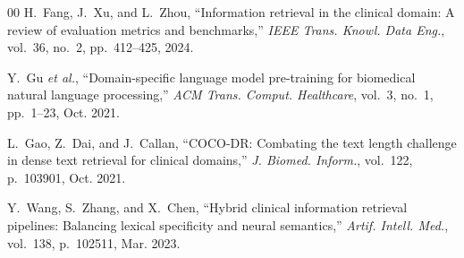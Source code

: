 \documentclass[conference]{IEEEtran}
\begin{document}
\begin{thebibliography}{00}
H.~Fang, J.~Xu, and L.~Zhou, ``Information retrieval in the clinical domain: A review of evaluation metrics and benchmarks,'' \textit{IEEE Trans. Knowl. Data Eng.}, vol.~36, no.~2, pp.~412--425, 2024.

Y.~Gu \textit{et al.}, ``Domain-specific language model pre-training for biomedical natural language processing,'' \textit{ACM Trans. Comput. Healthcare}, vol.~3, no.~1, pp.~1--23, Oct. 2021.

L.~Gao, Z.~Dai, and J.~Callan, ``COCO-DR: Combating the text length challenge in dense text retrieval for clinical domains,'' \textit{J. Biomed. Inform.}, vol.~122, p.~103901, Oct. 2021.

Y.~Wang, S.~Zhang, and X.~Chen, ``Hybrid clinical information retrieval pipelines: Balancing lexical specificity and neural semantics,'' \textit{Artif. Intell. Med.}, vol.~138, p.~102511, Mar. 2023.
\end{thebibliography}
\end{document}
